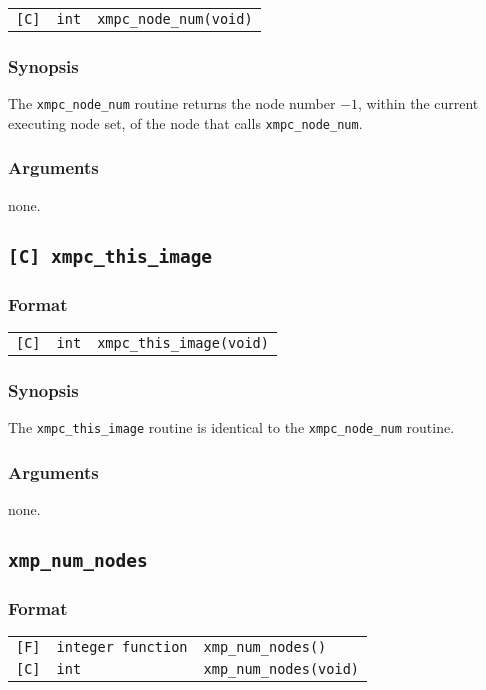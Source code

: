 \begin{tabular}{lll}
\verb![C]!&  {\tt int}& {\tt xmpc\_node\_num(void)}
\end{tabular}

\subsubsection*{Synopsis}
The {\tt xmpc\_node\_num} routine returns the node number $- 1$,
within the current executing node set, of the node that calls {\tt xmpc\_node\_num}.

\subsubsection*{Arguments}
none.

\subsection{\tt [C] xmpc\_this\_image}\label{sub:xmpcthisimage}

\subsubsection*{Format}

\begin{tabular}{lll}
\verb![C]!&  {\tt int}& {\tt xmpc\_this\_image(void)}
\end{tabular}

\subsubsection*{Synopsis}
The {\tt xmpc\_this\_image} routine is identical to the {\tt xmpc\_node\_num} routine.

\subsubsection*{Arguments}
none.

\subsection{\tt xmp\_num\_nodes}

\subsubsection*{Format}

\begin{tabular}{lll}
\verb![F]!&  {\tt integer function}& {\tt xmp\_num\_nodes()}\\
\verb![C]!&  {\tt int}& {\tt xmp\_num\_nodes(void)}
\end{tabular}

